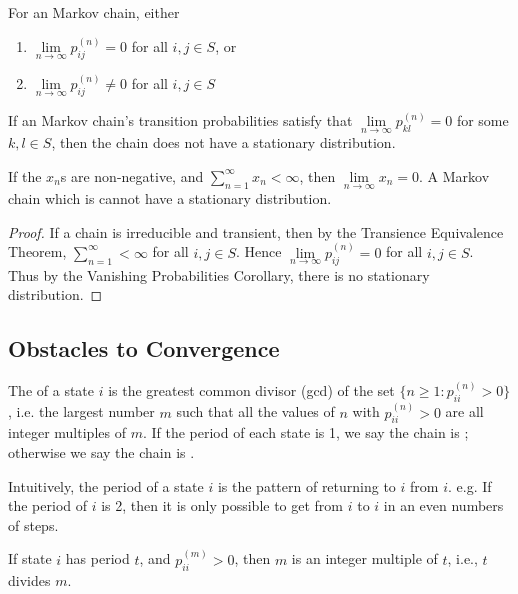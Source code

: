 \documentclass[11pt]{article}
\newcommand{\limit}[1]{\underset{{#1} \rightarrow \infty}{\lim}}
\newcommand{\dur}[3]{{#1}_{#2}^{({#3})}}
\begin{document}
     For an  Markov chain, either
    \begin{enumerate}
    	\item $\limit{n} p_{ij}^{(n)} = 0$ for all $i, j \in S$, or
    	\item $\limit{n} p_{ij}^{(n)} \neq 0$ for all $i, j \in S$
    \end{enumerate}
    
	 If an  Markov chain's transition probabilities satisfy that $\limit{n} p_{kl}^{(n)} = 0$ for some $k, l 
	\in S$, then the chain does not have a stationary distribution.  
    
    \lemma If the $x_n$s are non-negative, and $\sum_{n=1}^\infty x_n < \infty$, then $\limit{n} x_n = 0$.
     A Markov chain which is  cannot have a stationary distribution.
    \begin{proof}
    	If a chain is irreducible and transient, then by the Transience Equivalence Theorem,
    	$\sum_{n=1}^\infty < \infty$ for all $i, j \in S$. Hence $\limit{n}\dur{p}{ij}{n} = 0$ for all $i, j \in S$. \\
    	Thus by the Vanishing Probabilities Corollary, there is no stationary distribution.
    	
    	
    	
    \end{proof}
    \subsection{Obstacles to Convergence}
     The  of a state $i$ is the greatest common divisor (gcd) of the set $\{n \geq 1: p_{ii}^{(n)} > 0\}$, i.e. the largest number $m$ such that all the values of $n$ with $p_{ii}^{(n)} > 0$ are all integer multiples of $m$. If the period of each state is 1, we say the chain is ; otherwise we say the chain is .
    
    \remark
    Intuitively, the period of a state $i$ is the pattern of returning to $i$ from $i$. e.g. If the period of $i$ is 2, then it is only possible to get from $i$ to $i$ in an even numbers of steps.
    
    \fact
    If state $i$ has period $t$, and $\dur{p}{ii}{m} > 0$, then $m$ is an integer multiple of $t$, i.e., $t$ divides $m$.
    
\end{document}
